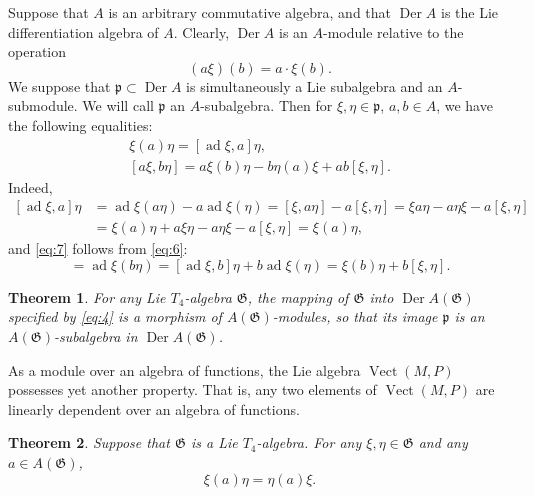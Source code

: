\documentclass[a4paper]{article}
\newtheorem{theorem}{Theorem}
\newcommand{\ad}{\operatorname{ad}}
\newcommand{\Der}{\operatorname{Der}}
\newcommand{\Vect}{\operatorname{Vect}}
\begin{document}
Suppose that $A$ is an arbitrary commutative algebra, and that $\Der A$ is the Lie differentiation algebra of $A$.
Clearly, $\Der A$ is an $A$-module relative to the operation
\begin{equation}
	\label{eq:5}
	(a\xi)(b) = a \cdot \xi(b).
\end{equation}
We suppose that $\mathfrak{p} \subset \Der A$ is simultaneously a Lie subalgebra and an $A$-submodule.
We will call $\mathfrak{p}$ an $A$-subalgebra.
Then for $\xi,\eta \in \mathfrak{p}$, $a,b \in A$, we have the following equalities:
\begin{gather}
	\label{eq:6}
	\xi(a) \eta = [\ad \xi,a]\eta, \\
	\label{eq:7}
	[a \xi, b \eta] = a \xi(b) \eta - b \eta(a) \xi + ab [\xi, \eta].
\end{gather}
Indeed,
\begin{equation*}
	\begin{split}
		[\ad \xi, a]\eta 
		& = \ad \xi (a\eta) - a \ad \xi(\eta)
		= [\xi, a\eta] - a[\xi,\eta] 
		= \xi a \eta - a \eta \xi - a[\xi,\eta] \\
		& = \xi(a) \eta + a \xi \eta - a \eta \xi - a [\xi,\eta] = \xi(a) \eta,
	\end{split}
\end{equation*}
and \eqref{eq:7} follows from \eqref{eq:6}:
\begin{equation*}
	[\xi,b\eta] = \ad \xi (b\eta)
	= [\ad \xi,b] \eta + b \ad \xi(\eta)
	= \xi(b) \eta + b[\xi,\eta].
\end{equation*}

\begin{theorem}
	\label{thm:3}
	For any Lie $T_4$-algebra $\mathfrak{G}$, the mapping of $\mathfrak{G}$ into $\Der A(\mathfrak{G})$ specified by \eqref{eq:4} is a morphism of $A(\mathfrak{G})$-modules, so that its image $\mathfrak{p}$ is an $A(\mathfrak{G})$-subalgebra in $\Der A(\mathfrak{G})$. 
\end{theorem}

As a module over an algebra of functions, the Lie algebra $\Vect(M,P)$ possesses yet another property.
That is, any two elements of $\Vect(M,P)$ are linearly dependent over an algebra of functions.

\begin{theorem}
	\label{thm:4}
	Suppose that $\mathfrak{G}$ is a Lie $T_4$-algebra.
	For any $\xi,\eta \in \mathfrak{G}$ and any $a \in A(\mathfrak{G})$,
	\begin{equation}
		\label{eq:8}
		\xi(a) \eta = \eta(a) \xi.
	\end{equation}
\end{theorem}
\end{document}
